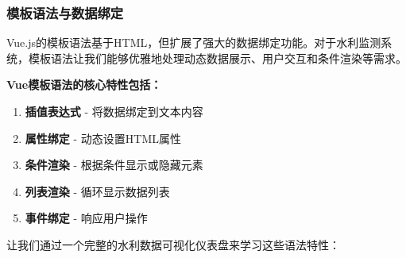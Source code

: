 \subsubsection{模板语法与数据绑定}\label{ux6a21ux677fux8bedux6cd5ux4e0eux6570ux636eux7ed1ux5b9a}

Vue.js的模板语法基于HTML，但扩展了强大的数据绑定功能。对于水利监测系统，模板语法让我们能够优雅地处理动态数据展示、用户交互和条件渲染等需求。

\textbf{Vue模板语法的核心特性包括：}

\begin{enumerate}
\def\labelenumi{\arabic{enumi}.}
\tightlist
\item
  \textbf{插值表达式} - 将数据绑定到文本内容
\item
  \textbf{属性绑定} - 动态设置HTML属性
\item
  \textbf{条件渲染} - 根据条件显示或隐藏元素
\item
  \textbf{列表渲染} - 循环显示数据列表
\item
  \textbf{事件绑定} - 响应用户操作
\end{enumerate}

让我们通过一个完整的水利数据可视化仪表盘来学习这些语法特性：

